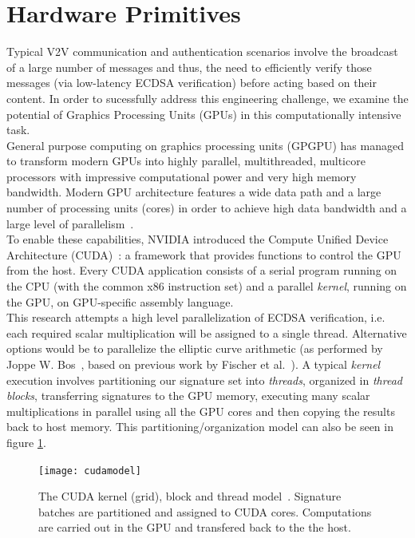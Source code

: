 \documentclass[11pt,twocolumn]{IEEEtran}
\begin{document}
\section{Hardware Primitives}\label{cuda}
Typical V2V communication and authentication scenarios involve the broadcast of a large number of messages and thus, the need to efficiently verify those messages (via low-latency ECDSA verification) before acting based on their content. In order to sucessfully address this engineering challenge, we examine the potential of Graphics Processing Units (GPUs) in this computationally intensive task.\\
General purpose computing on graphics processing units (GPGPU) has managed to transform modern GPUs into highly parallel, multithreaded, multicore processors with impressive computational power and very high memory bandwidth. Modern GPU architecture features a wide data path and a large number of processing units (cores) in order to achieve high data bandwidth and a large level of parallelism~\cite{cudaguide}.\\
To enable these capabilities, NVIDIA introduced the Compute Unified Device Architecture (CUDA)~\cite{cudaguide}: a framework that provides functions to control the GPU from the host. Every CUDA application consists of a serial program running on the CPU (with the common x86 instruction set) and a parallel \emph{kernel}, running on the GPU, on GPU-specific assembly language.\\
This research attempts a high level parallelization of ECDSA verification, i.e. each required scalar multiplication will be assigned to a single thread. Alternative options would be to parallelize the elliptic curve arithmetic (as performed by Joppe W. Bos~\cite{bos}, based on previous work by Fischer et al.~\cite{fischer}).  A typical \emph{kernel} execution involves partitioning our signature set into \emph{threads}, organized in \emph{thread blocks}, transferring signatures to the GPU memory, executing many scalar multiplications in parallel using all the GPU cores and then copying the results back to host memory. This partitioning/organization model can also be seen in figure \ref{cudamodel}.
\begin{figure}
\centering
\texttt{[image: cudamodel]}
\caption{The CUDA kernel (grid), block and thread model~\cite{cudaguide}. Signature batches are partitioned and assigned to CUDA cores. Computations are carried out in the GPU and transfered back to the the host.}
\label{cudamodel}
\end{figure}
\end{document}
